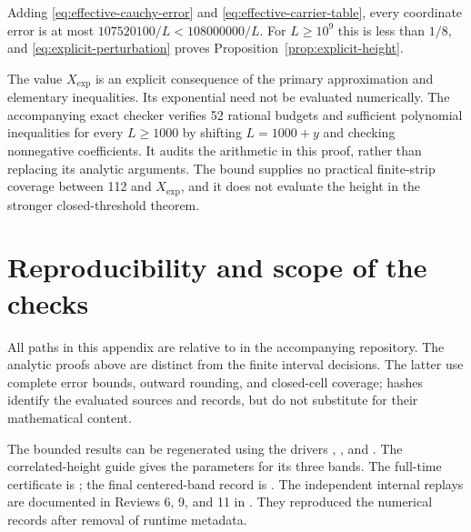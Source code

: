 \documentclass[11pt]{article}
\numberwithin{equation}{section}
\theoremstyle{definition}
\theoremstyle{remark}
\begin{document}
Adding \eqref{eq:effective-cauchy-error} and
\eqref{eq:effective-carrier-table}, every coordinate error is at most
$107520100/L<108000000/L$. For $L\ge10^9$ this is less than $1/8$,
and \eqref{eq:explicit-perturbation} proves
Proposition~\ref{prop:explicit-height}.

The value $X_{\mathrm{exp}}$ is an explicit consequence of the primary
approximation and elementary inequalities. Its exponential need not be
evaluated numerically. The accompanying exact checker verifies 52 rational
budgets and sufficient polynomial inequalities for every $L\ge1000$ by
shifting $L=1000+y$ and checking nonnegative coefficients. It audits the
arithmetic in this proof, rather than replacing its analytic arguments.
The bound supplies no practical finite-strip coverage between 112 and
$X_{\mathrm{exp}}$, and it does not evaluate the height in the stronger
closed-threshold theorem.

\section{Reproducibility and scope of the checks}\label{app:replay}
\begingroup\raggedright

All paths in this appendix are relative to
in the accompanying repository. The analytic proofs above are distinct
from the finite interval decisions. The latter use complete error
bounds, outward rounding, and closed-cell coverage; hashes identify
the evaluated sources and records, but do not substitute for their
mathematical content.

The bounded results can be regenerated using the drivers
,
, and
.
The correlated-height guide
gives the parameters for its three bands. The full-time certificate is
;
the final centered-band record is
.
The independent internal replays are documented in Reviews 6, 9, and 11
in . They reproduced the numerical records after removal
of runtime metadata.
\end{document}
